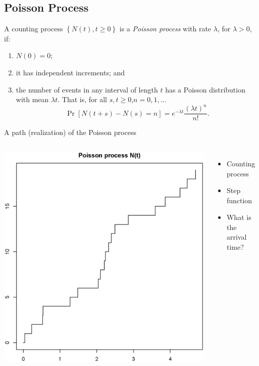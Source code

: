 \documentclass[11pt]{beamer}
\begin{document}
\subsection{Poisson Process}
\begin{frame}A counting process $\left\{ N\left( t\right) ,t\geq 0\right\} $ is
a \alert{\textit{Poisson process}} with rate $\lambda $, for $\lambda >0$, if:

\begin{enumerate}
\item $N\left( 0\right) =0$;

\item it has independent increments; and

\item the number of events in any interval of length $t$ has a Poisson
distribution with mean $\lambda t$. That is, for all $s,t\geq 0$,$n=0,1,...$%
\begin{equation*}
\text{$\Pr $}\left[ N\left( t+s\right) -N\left( s\right) =n\right]
=e^{-\lambda t}\frac{\left( \lambda t\right) ^{n}}{n!}.
\end{equation*}%
\newpage
\end{enumerate}

\end{frame}
\begin{frame}{A path (realization) of the Poisson  process}

\begin{columns}
\includegraphics[scale=0.4]{Poisson}
\begin{itemize}
\item Counting process
\item Step function
\item What is the \alert{arrival time}?
\end{itemize}
\end{columns}

\end{frame}
\end{document}

